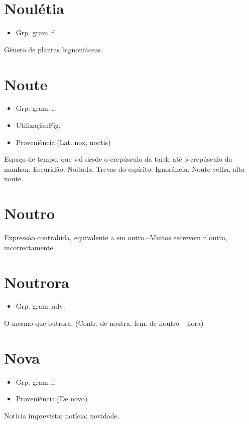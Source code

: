 \section{Noulétia}
\begin{itemize}
\item {Grp. gram.:f.}
\end{itemize}
Gênero de plantas bignoniáceas.
\section{Noute}
\begin{itemize}
\item {Grp. gram.:f.}
\end{itemize}
\begin{itemize}
\item {Utilização:Fig.}
\end{itemize}
\begin{itemize}
\item {Proveniência:(Lat. \textunderscore nox\textunderscore , \textunderscore noctis\textunderscore )}
\end{itemize}
Espaço de tempo, que vai desde o crepúsculo da tarde até o crepúsculo da manhan.
Escuridão.
Noitada.
Trevas do espírito.
Ignorância.
\textunderscore Noute velha\textunderscore , alta noute.
\section{Noutro}
Expressão contrahida, equivalente a \textunderscore em outro\textunderscore .--Muitos escrevem \textunderscore n'outro\textunderscore , incorrectamente.
\section{Noutrora}
\begin{itemize}
\item {Grp. gram.:adv.}
\end{itemize}
O mesmo que \textunderscore outrora\textunderscore .
(Contr. de \textunderscore noutra\textunderscore , fem. de \textunderscore noutro\textunderscore  + \textunderscore hora\textunderscore )
\section{Nova}
\begin{itemize}
\item {Grp. gram.:f.}
\end{itemize}
\begin{itemize}
\item {Proveniência:(De \textunderscore novo\textunderscore )}
\end{itemize}
Notícia imprevista; notícia; novidade.

